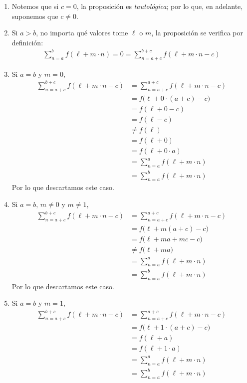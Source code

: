 \begin{enumerate}[label=\alph*)]
  \begin{enumerate}[label=\Roman*)]
    \item Notemos que si $c=0$, la proposición es \textit{tautológica}; por lo que, en adelante, suponemos que $c\neq 0$.
    \item Si $a>b$, no importa qué valores tome $\ell$ o $m$, la proposición se verifica por definición:
    \begin{align*}
      \sum_{n=a}^b f(\ell+m\cdot n) = 0 = \sum_{n=a+c}^{b+c} f(\ell+m\cdot n-c)
    \end{align*}
    \item Si $a=b$ y $m=0$,
    \begin{align*}
      \sum_{n=a+c}^{b+c} f(\ell+m\cdot n-c) &= \sum_{n=a+c}^{a+c} f(\ell+m\cdot n-c)\\
      &= f\bigl(\ell+0\cdot (a+c)-c\bigr)\\
      &=f(\ell+0-c)\\
      &= f(\ell-c)\\
      &\neq f(\ell)\\
      &= f(\ell+0)\\
      &= f(\ell+0\cdot a)\\
      &= \sum_{n=a}^a f(\ell+m\cdot n)\\
      &= \sum_{n=a}^b f(\ell+m\cdot n)
    \end{align*}
    Por lo que descartamos este caso.

    \item Si $a=b$, $m\neq 0$ y $m\neq 1$,
    \begin{align*}
      \sum_{n=a+c}^{b+c} f(\ell+m\cdot n-c) &= \sum_{n=a+c}^{a+c} f(\ell+m\cdot n-c)\\
      &= f\bigl(\ell+m(a+c)-c\bigr)\\
      &= f\bigl(\ell+ma+mc-c\bigr)\\
      &\neq f\bigl(\ell+ma\bigr)\\
      &= \sum_{n=a}^a f(\ell+m\cdot n)\\
      &= \sum_{n=a}^b f(\ell+m\cdot n)
    \end{align*}
    Por lo que descartamos este caso.

    \item Si $a=b$ y $m=1$,
    \begin{align*}
      \sum_{n=a+c}^{b+c} f(\ell+m\cdot n-c) &= \sum_{n=a+c}^{a+c} f(\ell+m\cdot n-c)\\
      &= f\bigl(\ell+1\cdot (a+c)-c\bigr)\\
      &= f(\ell + a)\\
      &= f(\ell+1\cdot a)\\
      &= \sum_{n=a}^a f(\ell+m\cdot n)\\
      &= \sum_{n=a}^b f(\ell+m\cdot n)
    \end{align*}


\end{enumerate}
\end{enumerate}
